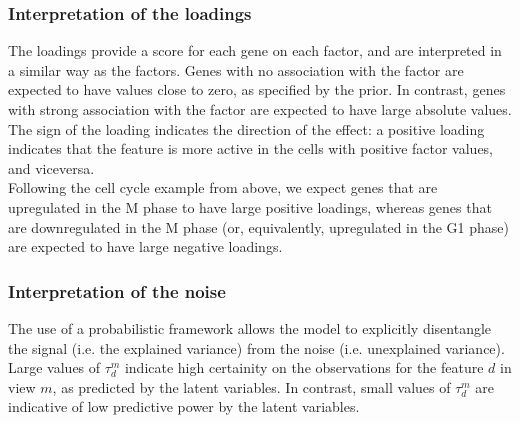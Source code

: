 \subsubsection{Interpretation of the loadings}
The loadings provide a score for each gene on each factor, and are interpreted in a similar way as the factors. Genes with no association with the factor are expected to have values close to zero, as specified by the prior. In contrast, genes with strong association with the factor are expected to have large absolute values. The sign of the loading indicates the direction of the effect: a positive loading indicates that the feature is more active in the cells with positive factor values, and viceversa. \\
Following the cell cycle example from above, we expect genes that are upregulated in the M phase to have large positive loadings, whereas genes that are downregulated in the M phase (or, equivalently, upregulated in the G1 phase) are expected to have large negative loadings.\\




\subsubsection{Interpretation of the noise}
The use of a probabilistic framework allows the model to explicitly disentangle the signal (i.e. the explained variance) from the noise (i.e. unexplained variance). Large values of $\tau_d^m$ indicate high certainity on the observations for the feature $d$ in view $m$, as predicted by the latent variables. In contrast, small values of $\tau_d^m$ are indicative of low predictive power by the latent variables.

